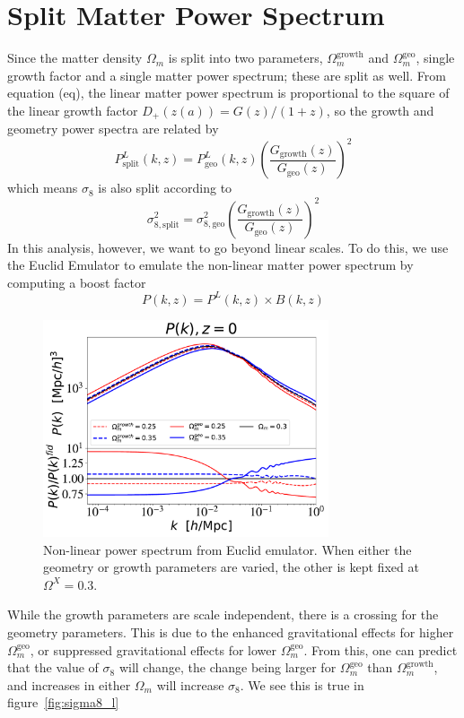 \section{Split Matter Power Spectrum}
Since the matter density $\Omega_m$ is split into two parameters, $\Omega_m^{\text{growth}}$ and $\Omega_m^{\text{geo}}$, single growth factor and a single matter power spectrum; these are split as well. From equation (eq), the linear matter power spectrum is proportional to the square of the linear growth factor $D_+(z(a)) = G(z)/(1+z)$, so the growth and geometry power spectra are related by
\begin{equation}
	P^L_{\text{split}}(k,z) = P^L_{\text{geo}}(k,z) \left(\frac{G_{\text{growth}}(z)}{G_{\text{geo}}(z)}\right)^2
\end{equation}
which means $\sigma_8$ is also split according to
\begin{equation}
	\sigma_{8,\text{split}}^2 = \sigma_{8,\text{geo}}^2 \left(\frac{G_{\text{growth}}(z)}{G_{\text{geo}}(z)}\right)^2
\end{equation}
In this analysis, however, we want to go beyond linear scales. To do this, we use the Euclid Emulator to emulate the non-linear matter power spectrum by computing a boost factor
\begin{equation}
	P(k,z) = P^L(k,z) \times B(k,z)
\end{equation}
\begin{figure}[ht]
	\centering
	\includegraphics[width=0.75\textwidth]{plots/Pk.pdf}
	\caption{Non-linear power spectrum from Euclid emulator. When either the geometry or growth parameters are varied, the other is kept fixed at $\Omega^X=0.3$.}
	\label{fig:pk}
\end{figure}
While the growth parameters are scale independent, there is a crossing for the geometry parameters. This is due to the enhanced gravitational effects for higher $\Omega_m^{\mathrm{geo}}$, or suppressed gravitational effects for lower $\Omega_m^\mathrm{geo}$. From this, one can predict that the value of $\sigma_8$ will change, the change being larger for $\Omega_m^\mathrm{geo}$ than $\Omega_m^\mathrm{growth}$, and increases in either $\Omega_m$ will increase $\sigma_8$. We see this is true in figure~\ref{fig:sigma8_l}
